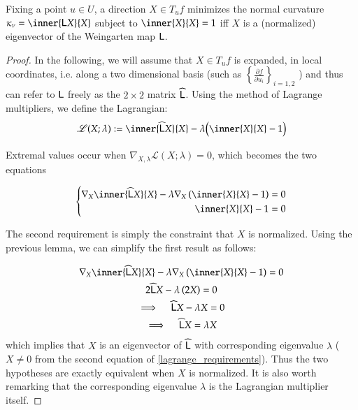     \begin{theorem}
       	Fixing a point $u \in U$, a direction $X \in T_u f $ minimizes the normal curvature $\kappa_\nu = \inner{\wein X}{X}$ subject to $\inner{X}{X}= 1$
       	iff $X$ is a (normalized) eigenvector of the Weingarten map $\mathsf{L}$.
       	\end{theorem}
    \begin{proof}
       		
       		In the following, we will assume that $X \in T_u f$ is expanded,
       		in local coordinates, i.e. along  a two dimensional basis
       		(such as $\left\{ \frac{\partial f}{\partial u_i}\right\}_{i=1,2}$
       		) and thus can refer to $\mathsf{L}$ freely as the $2\times2$ matrix $\widehat{\mathsf{L}}$.
       		Using the method of Lagrange multipliers, we define the Lagrangian:
       		\begin{equation}
       		\mathscr{L}(X; \lambda) :=
        	\inner{\weinmat X}{X} - \lambda\Big(\inner{X}{X} - 1\Big) 
     \end{equation}
        	
        	Extremal values occur when
        	$\nabla_{X,\lambda} \mathscr{L}(X;\lambda) = 0$,
        	which becomes the two equations
        	
     \begin{equation} \label{lagrange_requirements}
     \left\{ \begin{aligned}
      \nabla_X \inner{\weinmat X}{X} - \lambda \nabla_X \left( \inner{X}{X} - 1 \right) = 0 \\
      \inner{X}{X} - 1 = 0
     \end{aligned} \right.
     \end{equation}
     
     The second requirement is simply the constraint that $X$ is normalized.
     Using the previous lemma, we can simplify the first result as follows:
     
     \begin{gather}
     \nabla_X \inner{\weinmat X}{X} - \lambda \nabla_X \left( \inner{X}{X} - 1 \right) = 0 
     \nonumber \\
     2\weinmat X - \lambda \left(2 X \right) = 0  \nonumber \\
     \implies \quad \weinmat X - \lambda X = 0 \nonumber \\
     \implies \quad \weinmat X = \lambda X
     \end{gather}
     which implies that $X$ is an eigenvector of  $\widehat{\mathsf{L}}$ with corresponding eigenvalue $\lambda$ ($X\ne 0 $ from the second equation of \cref{lagrange_requirements}).
     Thus the two hypotheses are exactly equivalent when $X$ is normalized. It is also worth remarking that the corresponding eigenvalue $\lambda$ is the Lagrangian multiplier itself.
       	\end{proof}
       	
